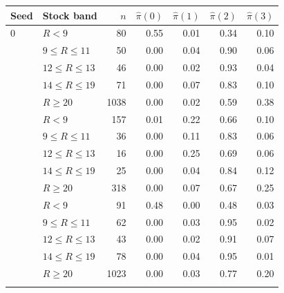 \begin{tabular}{llrrrrr}
\toprule
Seed & Stock band & $n$ & $\hat\pi(0)$ & $\hat\pi(1)$ & $\hat\pi(2)$ & $\hat\pi(3)$ \\
\midrule
0 & $R<9$ & 80 & 0.55 & 0.01 & 0.34 & 0.10 \\
 & $9\le R\le 11$ & 50 & 0.00 & 0.04 & 0.90 & 0.06 \\
 & $12\le R\le 13$ & 46 & 0.00 & 0.02 & 0.93 & 0.04 \\
 & $14\le R\le 19$ & 71 & 0.00 & 0.07 & 0.83 & 0.10 \\
 & $R\ge 20$ & 1038 & 0.00 & 0.02 & 0.59 & 0.38 \\
\addlinespace
1 & $R<9$ & 157 & 0.01 & 0.22 & 0.66 & 0.10 \\
 & $9\le R\le 11$ & 36 & 0.00 & 0.11 & 0.83 & 0.06 \\
 & $12\le R\le 13$ & 16 & 0.00 & 0.25 & 0.69 & 0.06 \\
 & $14\le R\le 19$ & 25 & 0.00 & 0.04 & 0.84 & 0.12 \\
 & $R\ge 20$ & 318 & 0.00 & 0.07 & 0.67 & 0.25 \\
\addlinespace
2 & $R<9$ & 91 & 0.48 & 0.00 & 0.48 & 0.03 \\
 & $9\le R\le 11$ & 62 & 0.00 & 0.03 & 0.95 & 0.02 \\
 & $12\le R\le 13$ & 43 & 0.00 & 0.02 & 0.91 & 0.07 \\
 & $14\le R\le 19$ & 78 & 0.00 & 0.04 & 0.95 & 0.01 \\
 & $R\ge 20$ & 1023 & 0.00 & 0.03 & 0.77 & 0.20 \\
\addlinespace
\bottomrule
\end{tabular}
